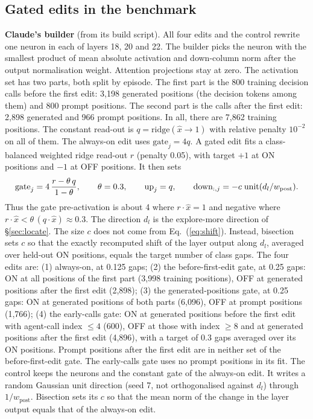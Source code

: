 \subsection{Gated edits in the benchmark}
\label{app:gated}
\textbf{Claude's builder} (from its build script). All four edits and the control rewrite one neuron in each of layers 18, 20 and 22. The builder picks the neuron with the smallest product of mean absolute activation and down-column norm after the output normalisation weight. Attention projections stay at zero. The activation set has two parts, both split by episode. The first part is the 800 training decision calls before the first edit: 3,198 generated positions (the decision tokens among them) and 800 prompt positions. The second part is the calls after the first edit: 2,898 generated and 966 prompt positions. In all, there are 7,862 training positions. The constant read-out is $q = \mathrm{ridge}(\hat{x} \rightarrow 1)$ with relative penalty $10^{-2}$ on all of them. The always-on edit uses $\mathrm{gate}_j = 4q$. A gated edit fits a class-balanced weighted ridge read-out $r$ (penalty 0.05), with target $+1$ at ON positions and $-1$ at OFF positions. It then sets
\begin{equation}
\label{eq:cgate}
    \mathrm{gate}_j = 4\, \frac{r - \theta\, q}{1 - \theta}, \qquad \theta = 0.3, \qquad \mathrm{up}_j = q, \qquad \mathrm{down}_{:,j} = -c \; \mathrm{unit}(d_l / w_{\mathrm{post}}).
\end{equation}
Thus the gate pre-activation is about 4 where $r \cdot \hat{x} = 1$ and negative where $r \cdot \hat{x} < \theta\, (q \cdot \hat{x}) \approx 0.3$. The direction $d_l$ is the explore-more direction of \S\ref{sec:locate}. The size $c$ does not come from Eq.~(\ref{eq:shift}). Instead, bisection sets $c$ so that the exactly recomputed shift of the layer output along $d_l$, averaged over held-out ON positions, equals the target number of class gaps. The four edits are:
(1) always-on, at 0.125 gaps;
(2) the before-first-edit gate, at 0.25 gaps: ON at all positions of the first part (3,998 training positions), OFF at generated positions after the first edit (2,898);
(3) the generated-positions gate, at 0.25 gaps: ON at generated positions of both parts (6,096), OFF at prompt positions (1,766);
(4) the early-calls gate: ON at generated positions before the first edit with agent-call index $\le 4$ (600), OFF at those with index $\ge 8$ and at generated positions after the first edit (4,896), with a target of 0.3 gaps averaged over its ON positions.
Prompt positions after the first edit are in neither set of the before-first-edit gate. The early-calls gate uses no prompt positions in its fit. The control keeps the neurons and the constant gate of the always-on edit. It writes a random Gaussian unit direction (seed 7, not orthogonalised against $d_l$) through $1/w_{\mathrm{post}}$. Bisection sets its $c$ so that the mean norm of the change in the layer output equals that of the always-on edit.

